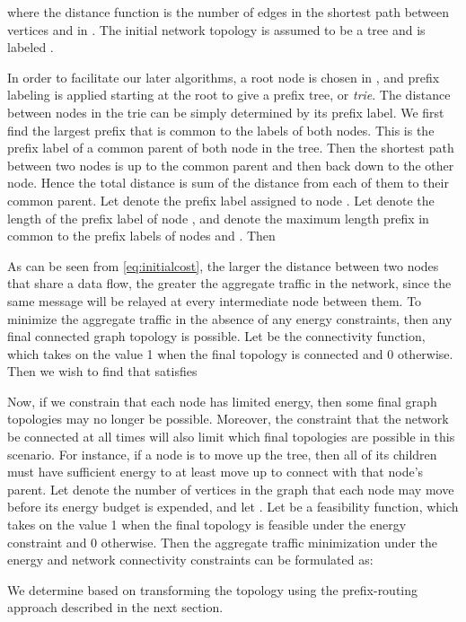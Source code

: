 \documentclass[10pt,conference]{IEEEtran}
\begin{document}
where the distance function  is the number of
edges in the shortest path between vertices  and  in
.  The initial network topology is assumed to be a tree
and is labeled .


In order to facilitate our later algorithms, a root node is chosen in
, and prefix labeling is applied starting at the root
to give a prefix tree, or {\it trie}.  The distance between nodes in
the trie can be simply determined by its prefix label. We first find
the largest prefix that is common to the labels of both nodes.  This
is the prefix label of a common parent of both node in the tree.  Then
the shortest path between two nodes is up to the common parent and
then back down to the other node. Hence the total distance is sum of
the distance from each of them to their common parent.  Let
 denote the prefix label assigned to node .  Let
 denote the length of the prefix label of node , and
 denote the maximum length prefix in common
to the prefix labels of nodes  and .  Then



As can be seen from \eqref{eq:initialcost}, the larger the distance
between two nodes that share a data flow, the greater the aggregate
traffic in the network, since the same message will be relayed at
every intermediate node between them.  To minimize the aggregate
traffic in the absence of any energy constraints, then any final connected graph
topology  is possible.  Let 
be the connectivity function, which takes on the value 1 when the
final topology is connected and 0 otherwise.  Then
we wish to find  that satisfies


Now, if we constrain that each node has limited energy, then some
final graph topologies may no longer be possible.  Moreover, the
constraint that the network be connected at all times will also limit
which final topologies are possible in this scenario.  For instance,
if a node is to move up the tree, then all of its children must have
sufficient energy to at least move up to connect with that node's
parent.  Let  denote the number of vertices in the graph that
each node may move before its energy budget is expended, and let
. Let
 be a
feasibility function, which takes on the value 1 when the final
topology is feasible under the energy constraint and 0 otherwise.
Then the aggregate traffic minimization under the energy and network
connectivity constraints can be formulated as:

We determine 
based on transforming the topology using the prefix-routing approach
described in the next section.
\end{document}
